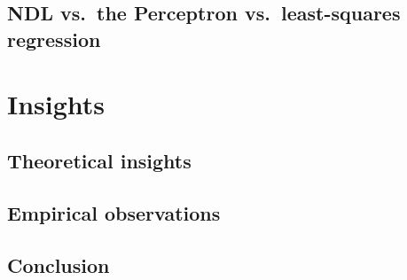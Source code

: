 \documentclass[t]{beamer} %
\begin{document}


\subsection{NDL vs.\ the Perceptron vs.\  least-squares regression}




\section{Insights}

\subsection{Theoretical insights}



\subsection{Empirical observations}



\subsection{Conclusion}





\end{document}
